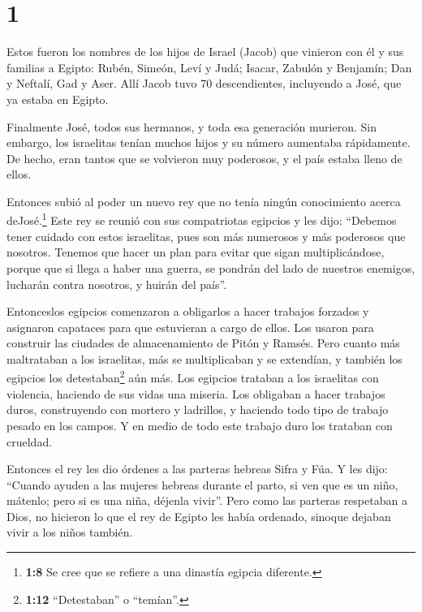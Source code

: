 \hypertarget{section}{%
\section{1}\label{section}}

 Estos fueron los nombres de los hijos de Israel (Jacob) que
vinieron con él y sus familias a Egipto:  Rubén, Simeón,
Leví y Judá;  Isacar, Zabulón y Benjamín;  Dan y
Neftalí, Gad y Aser.  Allí Jacob tuvo 70 descendientes,
incluyendo a José, que ya estaba en Egipto.

 Finalmente José, todos sus hermanos, y toda esa generación
murieron.  Sin embargo, los israelitas tenían muchos hijos y
su número aumentaba rápidamente. De hecho, eran tantos que se volvieron
muy poderosos, y el país estaba lleno de ellos.

 Entonces subió al poder un nuevo rey que no tenía ningún
conocimiento acerca deJosé.\footnote{\textbf{1:8} Se cree que se refiere
  a una dinastía egipcia diferente.}  Este rey se reunió con
sus compatriotas egipcios y les dijo: ``Debemos tener cuidado con estos
israelitas, pues son más numerosos y más poderosos que nosotros.
 Tenemos que hacer un plan para evitar que sigan
multiplicándose, porque que si llega a haber una guerra, se pondrán del
lado de nuestros enemigos, lucharán contra nosotros, y huirán del
país''.

 Entonceslos egipcios comenzaron a obligarlos a hacer
trabajos forzados y asignaron capataces para que estuvieran a cargo de
ellos. Los usaron para construir las ciudades de almacenamiento de Pitón
y Ramsés.  Pero cuanto más maltrataban a los israelitas,
más se multiplicaban y se extendían, y también los egipcios los
detestaban\footnote{\textbf{1:12} ``Detestaban'' o ``temían''.} aún más.
 Los egipcios trataban a los israelitas con violencia,
 haciendo de sus vidas una miseria. Los obligaban a hacer
trabajos duros, construyendo con mortero y ladrillos, y haciendo todo
tipo de trabajo pesado en los campos. Y en medio de todo este trabajo
duro los trataban con crueldad.

 Entonces el rey les dio órdenes a las parteras hebreas
Sifra y Fúa.  Y les dijo: ``Cuando ayuden a las mujeres
hebreas durante el parto, si ven que es un niño, mátenlo; pero si es una
niña, déjenla vivir''.  Pero como las parteras respetaban a
Dios, no hicieron lo que el rey de Egipto les había ordenado, sinoque
dejaban vivir a los niños también.

